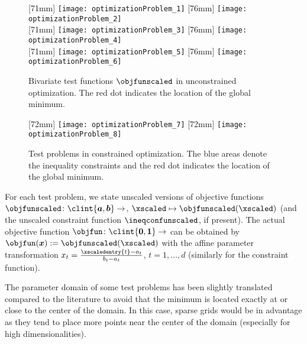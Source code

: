 \begin{figure}
  [71mm]{%
    \texttt{[image: optimizationProblem\_1]}%
  }%
  \hfill%
  [76mm]{%
    \texttt{[image: optimizationProblem\_2]}%
  }\\[2.5mm]%
  [71mm]{%
    \texttt{[image: optimizationProblem\_3]}%
  }%
  \hfill%
  [76mm]{%
    \texttt{[image: optimizationProblem\_4]}%
  }\\[2.5mm]%
  [71mm]{%
    \texttt{[image: optimizationProblem\_5]}%
  }%
  \hfill%
  [76mm]{%
    \texttt{[image: optimizationProblem\_6]}%
  }%
  \caption[%
    Unconstrained test problems%
  ]{%
    Bivariate test functions $\objfunscaled$ in unconstrained optimization.
    The \textcolor{C1}{red dot} indicates the location of the
    global minimum.%
  }%
  \label{fig:unconstrainedOptimizationProblem}%
\end{figure}

\begin{figure}
  [72mm]{%
    \texttt{[image: optimizationProblem\_7]}%
  }%
  \hfill%
  [72mm]{%
    \texttt{[image: optimizationProblem\_8]}%
  }%
  \caption[%
    Constrained test problems%
  ]{%
    Test problems in constrained optimization.
    The \textcolor{C0}{blue areas} denote the inequality constraints and
    the \textcolor{C1}{red dot} indicates the location of the
    global minimum.%
  }%
  \label{fig:constrainedOptimizationProblem}%
\end{figure}

For each test problem, we state unscaled versions of objective functions
$\objfunscaled\colon \clint{\*a, \*b} \to \real$,
$\xscaled \mapsto \objfunscaled(\xscaled)$
(and the unscaled constraint function $\ineqconfunscaled$, if present).
The actual objective function $\objfun\colon \clint{\*0, \*1} \to \real$
can be obtained by $\objfun(\*x) := \objfunscaled(\xscaled)$
with the affine parameter transformation
$x_t = \tfrac{\xscaledentry{t} - a_t}{b_t - a_t}$, $t = 1, \dotsc, d$
(similarly for the constraint function).

The parameter domain of some test problems has been slightly translated
compared to the literature
to avoid that the minimum is located exactly at or close to
the center of the domain.
In this case, sparse grids would be in advantage as
they tend to place more points near the center of the domain
(especially for high dimensionalities).
